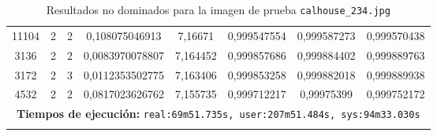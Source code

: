 \begin{longtable}{|c|c|c|c|c|c|c|c|}
11104 & 2 & 2 & 0,108075046913 & 7,16671 & 0,999547554 & 0,999587273 & 0,999570438 \\
3136 & 2 & 2 & 0,0083970078807 & 7,164452 & 0,999857686 & 0,999884402 & 0,999889763 \\
3172 & 2 & 3 & 0,0112353502775 & 7,163406 & 0,999853258 & 0,999882018 & 0,999889938 \\
4532 & 2 & 2 & 0,0817023626762 & 7,155735 & 0,999712217 & 0,99975399 & 0,999752172 \\
\hline
\multicolumn{8}{|c|}{\textbf{Tiempos de ejecución:} \texttt{real:69m51.735s, user:207m51.484s, sys:94m33.030s}}\\ \hline
\caption{Resultados no dominados para la imagen de prueba \texttt{calhouse\_234.jpg}}
\label{tab:calhouse_234}
\end{longtable}
\normalsize

